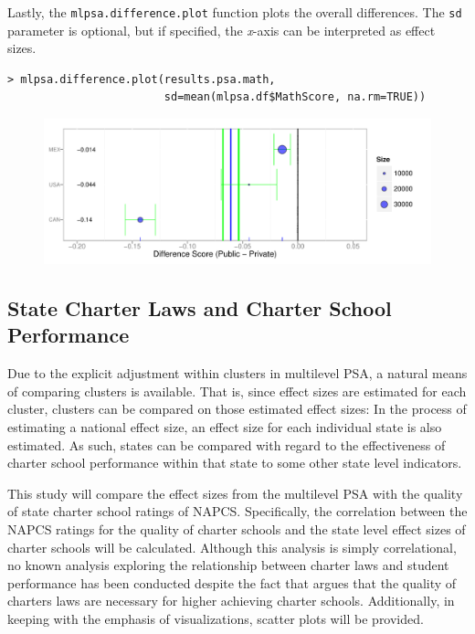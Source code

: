 \documentclass[letterpaper,12p,twoside]{article} %
\begin{document}
\clearpage
Lastly, the \texttt{mlpsa.difference.plot} function plots the overall differences. The \texttt{sd} parameter is optional, but if specified, the \textit{x}-axis can be interpreted as effect sizes.

\begin{verbatim}
> mlpsa.difference.plot(results.psa.math, 
                        sd=mean(mlpsa.df$MathScore, na.rm=TRUE))
\end{verbatim}

\begin{figure}[h!]
\begin{center}
\includegraphics[width=\textwidth]{../Figures/pisadiffplot.pdf}
\end{center}
\end{figure}

\subsection{State Charter Laws and Charter School Performance}

Due to the explicit adjustment within clusters in multilevel PSA, a natural means of comparing clusters is available. That is, since effect sizes are estimated for each cluster, clusters can be compared on those estimated effect sizes: In the process of estimating a national effect size, an effect size for each individual state is also estimated. As such, states can be compared with regard to the effectiveness of charter school performance within that state to some other state level indicators.

This study will compare the effect sizes from the multilevel PSA with the quality of state charter school ratings of NAPCS. Specifically, the correlation between the NAPCS ratings for the quality of charter schools and the state level effect sizes of charter schools will be calculated. Although this analysis is simply correlational, no known analysis exploring the relationship between charter laws and student performance has been conducted despite the fact that  argues that the quality of charters laws are necessary for higher achieving charter schools. Additionally, in keeping with the emphasis of visualizations, scatter plots will be provided.
\end{document}
